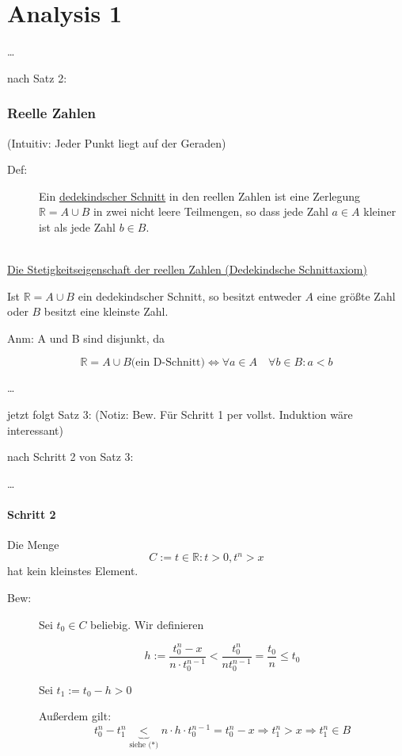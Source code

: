 \documentclass[12pt,a4paper,leqno]{article}
\author{Martin Dreher}
\begin{document}
\part*{Analysis 1}
\ldots

nach Satz 2:

\section*{Reelle Zahlen}

(Intuitiv: Jeder Punkt liegt auf der Geraden)

\begin{description}
\item[Def:] Ein \underline{dedekindscher Schnitt} in den reellen Zahlen ist eine Zerlegung $\mathbb{R} = A \cup B$ in zwei nicht leere Teilmengen, so dass jede Zahl $a \in A$ kleiner ist als jede Zahl $b \in B$.
\end{description}

\hfill \\

\underline{Die Stetigkeitseigenschaft der reellen Zahlen (Dedekindsche Schnittaxiom)}

\hfill

Ist $\mathbb{R} = A \cup B$ ein dedekindscher Schnitt, so besitzt entweder $A$  eine größte Zahl oder $B$ besitzt eine kleinste Zahl. 

Anm: A und B sind disjunkt, da 

$$\mathbb{R} = A \cup B \textrm{(ein D-Schnitt)} \Leftrightarrow \forall a \in A \quad \forall b \in B : a < b$$


\ldots

jetzt folgt Satz 3: (Notiz: Bew. Für Schritt 1 per vollst. Induktion wäre interessant)


nach Schritt 2 von Satz 3:

\ldots

\subsection*{Schritt 2}

Die Menge 
\begin{displaymath}
C := { t \in \mathbb{R}: t > 0, t^n>x}
\end{displaymath}
hat kein kleinstes Element.

\begin{description}
\item[Bew:] Sei $t_0 \in C$ beliebig. Wir definieren 

$$h := \frac{t_0^n-x}{n \cdot t_0^{n-1}} < \frac{t_0^n}{nt_0^{n-1}} = \frac{t_0}{n} \leq t_0$$


Sei $t_1 := t_0 - h > 0$

Außerdem gilt: 
$$t_0^n - t_1^n \underbrace{<}_{\textrm{siehe (*)}} n \cdot h \cdot t_0^{n-1} = t_0^n - x \Rightarrow t_1^n > x \Rightarrow t_1^n \in B$$

\end{description}
\end{document}
